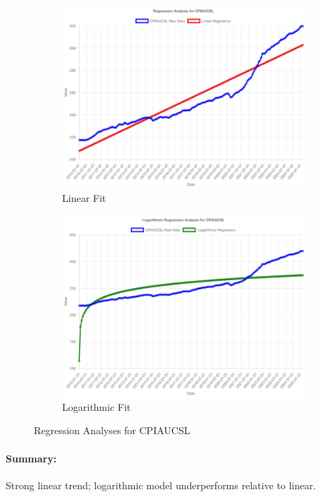 \documentclass[11pt,a4paper]{article}
\begin{document}
\begin{figure}[htbp]
  \centering
  \begin{subfigure}[b]{0.48\textwidth}
    \includegraphics[width=\textwidth]{backend/analyses/CPIAUCSL_analysis.png}
    \caption{Linear Fit}
  \end{subfigure}
  \hfill
  \begin{subfigure}[b]{0.48\textwidth}
    \includegraphics[width=\textwidth]{backend/analyses/CPIAUCSL_log_analysis.png}
    \caption{Logarithmic Fit}
  \end{subfigure}
  \caption{Regression Analyses for CPIAUCSL}
\end{figure}

\paragraph{Summary:}
Strong linear trend; logarithmic model underperforms relative to linear.
\end{document}
